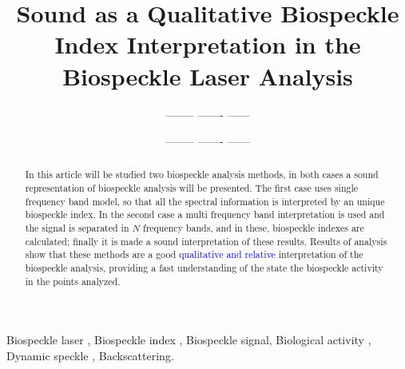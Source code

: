 \documentclass[review]{elsarticle}
\begin{document}
 

\begin{frontmatter}

\title{Sound as a Qualitative Biospeckle Index Interpretation in the Biospeckle Laser Analysis}



\author{-------- ------- ------}
\author{-------- ------- ------}





\begin{abstract}
In this article will be studied two biospeckle analysis methods, in both cases
a sound representation of biospeckle analysis will be presented. The first case
uses single frequency band model, so that all the spectral information is interpreted by
an unique biospeckle index. In the second case a multi frequency band interpretation
is used and the signal is separated in $N$ frequency bands, and in these, biospeckle
indexes are calculated; finally it is made a sound interpretation of these results.
Results of analysis show that these methods are a good \textcolor{blue}{qualitative and relative} 
interpretation of the biospeckle analysis, providing a fast understanding of the state the
biospeckle activity in the points analyzed.
\end{abstract}

\begin{keyword}
Biospeckle laser \sep 
Biospeckle index \sep 
Biospeckle signal\sep 
Biological activity \sep
Dynamic speckle \sep  
Backscattering.
\end{keyword}

\end{frontmatter}

\linenumbers

\end{document}
